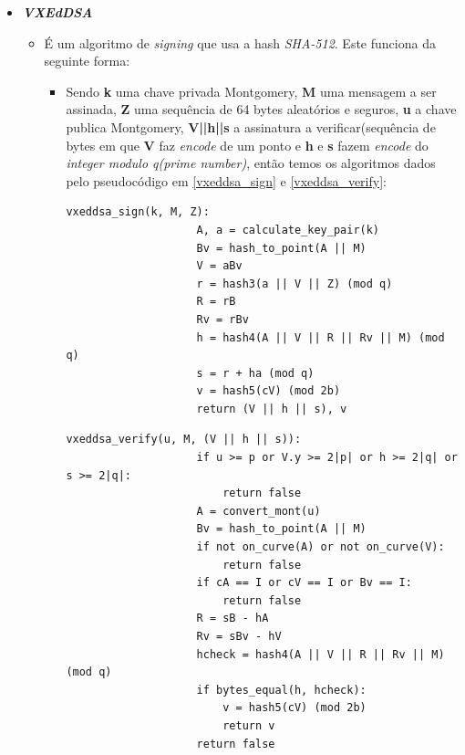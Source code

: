 \begin{itemize}
    \item \textit{\textbf{VXEdDSA}}
    \begin{itemize}
        \item É um algoritmo de \textit{signing} que usa a hash \textit{SHA-512}. Este funciona da seguinte forma:
        \begin{itemize}
            \item Sendo \textbf{k} uma chave privada Montgomery, \textbf{M} uma mensagem a ser assinada, \textbf{Z} uma sequência de 64 bytes aleatórios e seguros, \textbf{u} a chave publica Montgomery, \textbf{V||h||s} a assinatura a verificar(sequência de bytes em que \textbf{V} faz \textit{encode} de um ponto e \textbf{h} e \textbf{s} fazem \textit{encode} do \textit{integer modulo q(prime number)}, então temos os algoritmos dados pelo pseudocódigo em \ref{vxeddsa_sign} e \ref{vxeddsa_verify}:
            
            \begin{lstlisting}[caption=Assinatura de um documento,captionpos=b, label={vxeddsa_sign}]
                vxeddsa_sign(k, M, Z):
                    A, a = calculate_key_pair(k)
                    Bv = hash_to_point(A || M)
                    V = aBv
                    r = hash3(a || V || Z) (mod q)
                    R = rB
                    Rv = rBv
                    h = hash4(A || V || R || Rv || M) (mod q)
                    s = r + ha (mod q)
                    v = hash5(cV) (mod 2b)
                    return (V || h || s), v
                \end{lstlisting}
            
            \begin{lstlisting}[caption=Validação de assinatura de um documento,captionpos=b, label={vxeddsa_verify}]
                vxeddsa_verify(u, M, (V || h || s)):
                    if u >= p or V.y >= 2|p| or h >= 2|q| or s >= 2|q|:
                        return false
                    A = convert_mont(u)
                    Bv = hash_to_point(A || M)
                    if not on_curve(A) or not on_curve(V):
                        return false
                    if cA == I or cV == I or Bv == I:
                        return false
                    R = sB - hA
                    Rv = sBv - hV
                    hcheck = hash4(A || V || R || Rv || M) (mod q)
                    if bytes_equal(h, hcheck):
                        v = hash5(cV) (mod 2b)
                        return v
                    return false
            \end{lstlisting}
        \end{itemize}
    \end{itemize}
\end{itemize}

